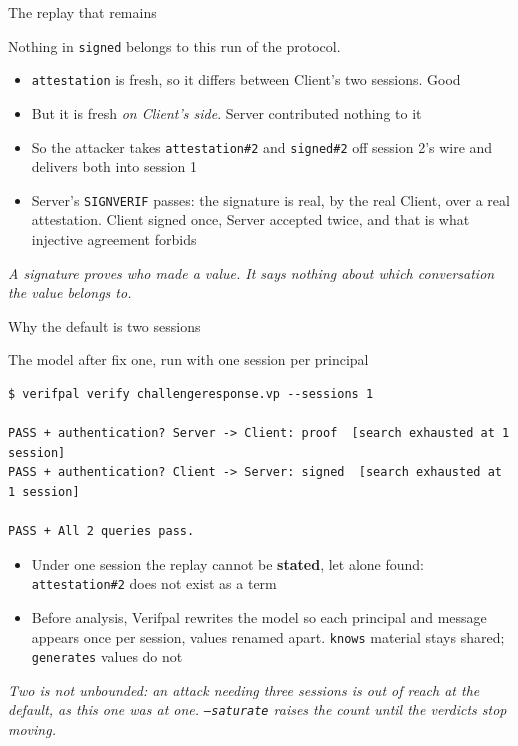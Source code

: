 \ifdefined\PRESENTATION\else\PassOptionsToClass{handout}{beamer}\fi\documentclass[aspectratio=169, lualatex]{beamer}
\begin{document}
\begin{frame}{The replay that remains}
	\begin{center}
		\Large
		Nothing in \texttt{signed} belongs to this run of the protocol.
	\end{center}
	\vspace{0.7em}
	\begin{itemize}
		\item \texttt{attestation} is fresh, so it differs between Client's two sessions. Good
		\item But it is fresh \textit{on Client's side}. Server contributed nothing to it
		\item So the attacker takes \texttt{attestation\#2} and \texttt{signed\#2} off session 2's wire and delivers both into session 1
		\item Server's \texttt{SIGNVERIF} passes: the signature is real, by the real Client, over a real attestation. Client signed once, Server accepted twice, and that is what injective agreement forbids
	\end{itemize}
	\vspace{0.5em}
	\begin{center}
		\textit{A signature proves who made a value. It says nothing about which conversation the value belongs to.}
	\end{center}
\end{frame}

\begin{frame}[fragile]{Why the default is two sessions}
	\begin{vpresult}{The model after fix one, run with one session per principal}
		\begin{lstlisting}
$ verifpal verify challengeresponse.vp --sessions 1

PASS + authentication? Server -> Client: proof  [search exhausted at 1 session]
PASS + authentication? Client -> Server: signed  [search exhausted at 1 session]

PASS + All 2 queries pass.
\end{lstlisting}
	\end{vpresult}
	\vspace{0.4em}
	\small
	\begin{itemize}
		\item Under one session the replay cannot be \textbf{stated}, let alone found: \texttt{attestation\#2} does not exist as a term
		\item Before analysis, Verifpal rewrites the model so each principal and message appears once per session, values renamed apart. \texttt{knows} material stays shared; \texttt{generates} values do not
	\end{itemize}
	\begin{center}
		\footnotesize
		\textit{Two is not unbounded: an attack needing three sessions is out of reach at the default, as this one was at one. \texttt{--saturate} raises the count until the verdicts stop moving.}
	\end{center}
\end{frame}
\end{document}
